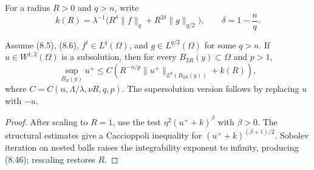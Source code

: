 For a radius $R>0$ and $q>n$, write
\begin{equation}
k(R)=\lambda^{-1}\bigl(R^\delta\|f\|_q+R^{2\delta}\|g\|_{q/2}\bigr),
\qquad \delta=1-\frac nq.
\tag{8.45}
\end{equation}

\begin{theorem}
\label{gt-thm-8-17-local-boundedness}
Assume (8.5), (8.6), $f^i\in L^q(\Omega)$, and
$g\in L^{q/2}(\Omega)$ for some $q>n$. If $u\in W^{1,2}(\Omega)$ is a
subsolution, then for every $B_{2R}(y)\subset\Omega$ and $p>1$,
\begin{equation}
\sup_{B_R(y)}u^+\leq C\left(R^{-n/p}\|u^+\|_{L^p(B_{2R}(y))}+k(R)\right),
\tag{8.46}
\end{equation}
where $C=C(n,\Lambda/\lambda,\nu R,q,p)$. The supersolution version follows by
replacing $u$ with $-u$.
\end{theorem}
\begin{proof}
\sketch After scaling to $R=1$, use the test
$\eta^2(u^++k)^\beta$ with $\beta>0$. The structural estimates give a Caccioppoli
inequality for $(u^++k)^{(\beta+1)/2}$. Sobolev iteration on nested balls raises
the integrability exponent to infinity, producing (8.46); rescaling restores $R$.
\end{proof}

